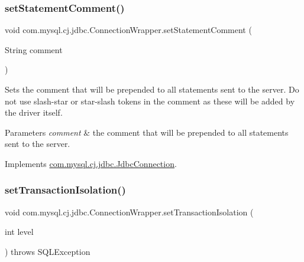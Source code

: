 \subsubsection{\texorpdfstring{set\+Statement\+Comment()}{setStatementComment()}}
{\footnotesize\ttfamily void com.\+mysql.\+cj.\+jdbc.\+Connection\+Wrapper.\+set\+Statement\+Comment (\begin{DoxyParamCaption}\item[{String}]{comment }\end{DoxyParamCaption})}

Sets the comment that will be prepended to all statements sent to the server. Do not use slash-\/star or star-\/slash tokens in the comment as these will be added by the driver itself.


\begin{DoxyParams}{Parameters}
{\em comment} & the comment that will be prepended to all statements sent to the server. \\
\hline
\end{DoxyParams}


Implements \mbox{\hyperlink{interfacecom_1_1mysql_1_1cj_1_1jdbc_1_1_jdbc_connection_adfbd59fbebd013673ed3eb97beb76179}{com.\+mysql.\+cj.\+jdbc.\+Jdbc\+Connection}}.

\mbox{\label{classcom_1_1mysql_1_1cj_1_1jdbc_1_1_connection_wrapper_a05b64dd17c2bdf5c3f95f514bf00bf90}} 
\subsubsection{\texorpdfstring{set\+Transaction\+Isolation()}{setTransactionIsolation()}}
{\footnotesize\ttfamily void com.\+mysql.\+cj.\+jdbc.\+Connection\+Wrapper.\+set\+Transaction\+Isolation (\begin{DoxyParamCaption}\item[{int}]{level }\end{DoxyParamCaption}) throws S\+Q\+L\+Exception}

\mbox{\label{classcom_1_1mysql_1_1cj_1_1jdbc_1_1_connection_wrapper_aab42e9d0d2398c58f88785a7fcba8369}} 
